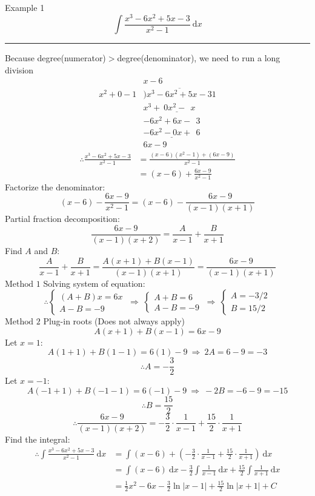 \documentclass[12pt,a4paper]{article}
\def\d{{\mathrm{d}}}
\begin{document}
\begin{eg}{Example 1}
	$$\int\frac{x^3-6x^2+5x-3}{x^2-1}\ \d x$$
	\noindent\rule[0.25\baselineskip]{\textwidth}{1pt}
	Because degree(numerator)$>$degree(denominator), we need to run a long division
	$$\begin{array}{lr} 
		& x-6 \\ 
		x^2+0-1  \!\!\!\!\!\! & \overline{)x^3-6x^2+5x-31} \\ 
		& \underline{x^3+\ 0x^2- \ \ x \ \ \ \ \ \ \ \ } \\ 
		& -6x^2+6x-\ \ 3 \\
		& \underline{-6x^2-0x+\ \ 6} \\ 
		& 6x-9 
	\end{array}$$
	$$\begin{aligned}
		\therefore \frac{x^3-6x^2+5x-3}{x^2-1}&=\frac{(x-6)(x^2-1)+(6x-9)}{x^2-1}\\
		&=(x-6)+\frac{6x-9}{x^2-1}
	\end{aligned}$$
	Factorize the denominator: 
	$$(x-6)-\frac{6x-9}{x^2-1}=(x-6)-\frac{6x-9}{(x-1)(x+1)}$$
	Partial fraction decomposition: \\
	$$\frac{6x-9}{(x-1)(x+2)}=\frac{A}{x-1}+\frac{B}{x+1}$$
	Find $A$ and $B$: 
	$$\frac{A}{x-1}+\frac{B}{x+1}=\frac{A(x+1)+B(x-1)}{(x-1)(x+1)}=\frac{6x-9}{(x-1)(x+1)}$$
	\quad $\boxed{\text{Method 1}}$ Solving system of equation: 
	$$\therefore\begin{cases}
		(A+B)x=6x\\
		A-B=-9
	\end{cases}\ \Rightarrow\ \begin{cases}
		A+B=6\\
		A-B=-9
	\end{cases}\ \Rightarrow\ \begin{cases}
		A=-3/2\\
		B=15/2
	\end{cases}$$
	\quad $\boxed{\text{Method 2}}$ Plug-in roots (Does not always apply)
	$$A(x+1)+B(x-1)=6x-9$$
	\quad\quad Let $x=1$: $$A(1+1)+B(1-1)=6(1)-9\ \Rightarrow\ 2A=6-9=-3$$ 
	$$\therefore A=-\frac{3}{2}$$
	\quad\quad Let $x=-1$: $$A(-1+1)+B(-1-1)=6(-1)-9\ \Rightarrow\ -2B=-6-9=-15$$
	$$\therefore B=\frac{15}{2}$$
	$$\therefore \frac{6x-9}{(x-1)(x+2)}=-\frac{3}{2}\cdot\frac{1}{x-1}+\frac{15}{2}\cdot\frac{1}{x+1}$$
	Find the integral: 
	$$\begin{aligned}
		\therefore\int\frac{x^3-6x^2+5x-3}{x^2-1}\ \d x&=\int(x-6)+\left(-\frac{3}{2}\cdot\frac{1}{x-1}+\frac{15}{2}\cdot\frac{1}{x+1}\right)\ \d x\\
		&=\int(x-6)\ \d x-\frac{3}{2}\int\frac{1}{x-1}\ \d x+\frac{15}{2}\int\frac{1}{x+1}\ \d x\\
		&=\frac{1}{2}x^2-6x-\frac{3}{2}\ln|x-1|+\frac{15}{2}\ln|x+1|+C
	\end{aligned}$$
\end{eg}
\end{document}
